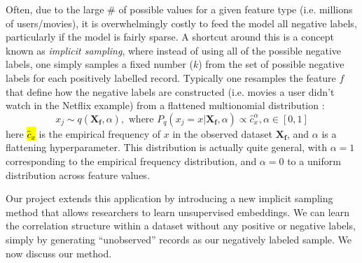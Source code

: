 \documentclass{article} %
\begin{document}
Often, due to the large \# of possible values for a given feature type (i.e. millions of users/movies), it is overwhelmingly costly to feed the model all negative labels, particularly if the model is fairly sparse.
A shortcut around this is a concept known as \textit{implicit sampling}, where instead of using all of the possible negative labels, one simply samples a fixed number ($k$) from the set of possible negative labels for each positively labelled record.
Typically one resamples the feature $f$ that define how the negative labels are constructed (i.e. movies a user didn't watch in the Netflix example) from a flattened multionomial distribution :
\[x_{j}\sim q(\mathbf{X_f},\alpha),\text{ where } P_q(x_j=x|\mathbf{X_f},\alpha)  \propto \hat c_x^\alpha,\alpha \in [0,1] \]
here \hl{$\hat c_x$}  is the empirical frequency of $x$ in the observed dataset $\mathbf{X_f}$, and $\alpha$ is a flattening hyperparameter. This distribution is actually quite general, with $\alpha=1$ corresponding to the empirical frequency distribution, and $\alpha=0$ to a uniform distribution across feature values.


Our project extends this application by introducing a new implicit sampling method that allows researchers to learn unsupervised embeddings. We can learn the correlation structure within a dataset without any positive or negative labels, simply by generating ``unobserved'' records as our negatively labeled sample. We now discuss our method.
\end{document}
